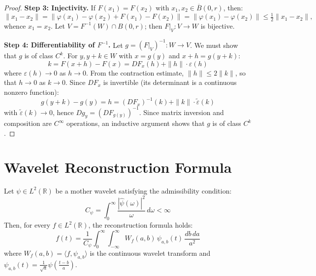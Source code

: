 \begin{proof}
\textbf{Step 3: Injectivity.}
If $F(x_1) = F(x_2)$ with $x_1, x_2 \in \overline{B}(0, r)$, then:
\[
\|x_1 - x_2\| = \|\varphi(x_1) - \varphi(x_2) + F(x_1) - F(x_2)\| = \|\varphi(x_1) - \varphi(x_2)\| \leq \tfrac{1}{2}\|x_1 - x_2\|,
\]
whence $x_1 = x_2$. Let $V = F^{-1}(W) \cap B(0, r)$; then $F|_V: V \to W$ is bijective.

\textbf{Step 4: Differentiability of $F^{-1}$.}
Let $g = (F|_V)^{-1}: W \to V$. We must show that $g$ is of class $C^k$. For $y, y + k \in W$ with $x = g(y)$ and $x + h = g(y + k)$:
\[
k = F(x + h) - F(x) = DF_x(h) + \|h\| \cdot \varepsilon(h)
\]
where $\varepsilon(h) \to 0$ as $h \to 0$. From the contraction estimate, $\|h\| \leq 2\|k\|$, so that $h \to 0$ as $k \to 0$. Since $DF_x$ is invertible (its determinant is a continuous nonzero function):
\[
g(y + k) - g(y) = h = (DF_x)^{-1}(k) + \|k\| \cdot \tilde{\varepsilon}(k)
\]
with $\tilde{\varepsilon}(k) \to 0$, hence $Dg_y = (DF_{g(y)})^{-1}$. Since matrix inversion and composition are $C^\infty$ operations, an inductive argument shows that $g$ is of class $C^k$.
\end{proof}


\section{Wavelet Reconstruction Formula}\label{sec:reconstruccion_wavelet}

\begin{theorem}\label{thm:reconstruccion_wavelet_apendice}
Let $\psi \in L^2(\mathbb{R})$ be a mother wavelet satisfying the admissibility condition:
\[
C_\psi = \int_0^\infty \frac{|\hat{\psi}(\omega)|^2}{\omega} \, d\omega < \infty
\]
Then, for every $f \in L^2(\mathbb{R})$, the reconstruction formula holds:
\[
f(t) = \frac{1}{C_\psi} \int_0^\infty \int_{-\infty}^{\infty} W_f(a, b) \, \psi_{a,b}(t) \, \frac{db \, da}{a^2}
\]
where $W_f(a, b) = \langle f, \psi_{a,b} \rangle$ is the continuous wavelet transform and $\psi_{a,b}(t) = \frac{1}{\sqrt{a}} \psi\left(\frac{t-b}{a}\right)$.
\end{theorem}

